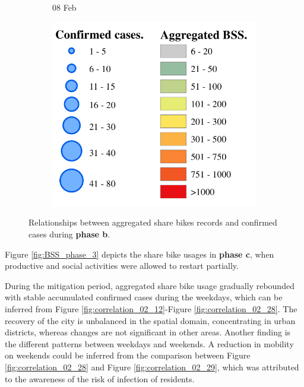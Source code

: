 \documentclass[ijgi,submit,moreauthors,pdftex]{Definitions/mdpi}
\begin{document}
\begin{figure}[!ht]
\begin{subfigure}{.3\textwidth}
\begin{tikzpicture}[inner sep = 0pt]
        \end{tikzpicture}
        \caption{08 Feb}
    \end{subfigure}
    \begin{subfigure}{.3\textwidth}
        \includegraphics[width=\textwidth]{Figures/Relation_with_confrimed_cases/legend7-eps-converted-to.pdf}
    \end{subfigure}
    \caption{Relationships between aggregated share bikes records and confirmed cases during \textbf{phase b}.}
    \label{fig:BSS_phase1_2}
\end{figure}

Figure \ref{fig:BSS_phase_3} depicts the share bike usages in \textbf{phase c}, when productive and social activities were allowed to restart partially.

During the mitigation period, aggregated share bike usage gradually rebounded with stable accumulated confirmed cases during the weekdays, which can be inferred from Figure \ref{fig:correlation_02_12}-Figure \ref{fig:correlation_02_28}.
The recovery of the city is unbalanced in the spatial domain, concentrating in urban districts, whereas changes are not significant in other areas.
Another finding is the different patterns between weekdays and weekends.
A reduction in mobility on weekends could be inferred from the comparison between Figure \ref{fig:correlation_02_28} and Figure \ref{fig:correlation_02_29}, which was attributed to the awareness of the risk of infection of residents.
\end{document}

